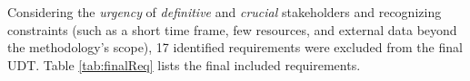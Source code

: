 \documentclass[authoryear,preprint,review,11pt,doubleblind]{elsarticle}
\begin{document}
Considering the \textit{urgency} of \textit{definitive} and \textit{crucial} stakeholders and recognizing constraints (such as a short time frame, few resources, and external data beyond the methodology's scope), 17 identified requirements were excluded from the final UDT. Table \ref{tab:finalReq} lists the final included requirements.
\end{document}
